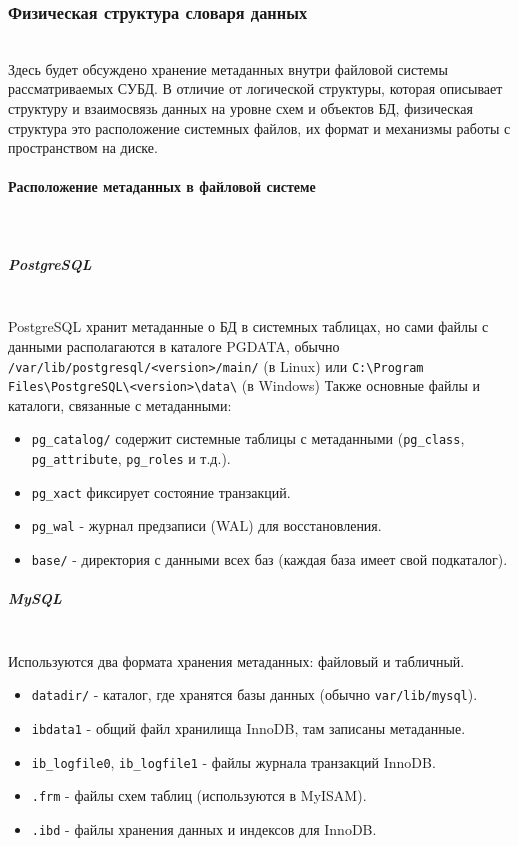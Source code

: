 \subsubsection{Физическая структура словаря данных} ~\\

Здесь будет обсуждено хранение метаданных внутри файловой системы рассматриваемых СУБД. В отличие от логической структуры, которая описывает структуру и взаимосвязь данных на уровне схем и объектов БД, физическая структура это расположение системных файлов, их формат и механизмы работы с пространством на диске.

\paragraph{Расположение метаданных в файловой системе} ~\\

\subparagraph{PostgreSQL} \autocite{PostgreSQLdocc65} ~\\

PostgreSQL хранит метаданные о БД в системных таблицах, но сами файлы с данными располагаются в каталоге PGDATA, обычно \texttt{/var/lib/postgresql/<version>/main/} (в Linux) или \texttt{C:\textbackslash{}Program Files\textbackslash{}PostgreSQL\textbackslash{}<version>\textbackslash{}data\textbackslash{}} (в Windows)
Также основные файлы и каталоги, связанные с метаданными:
\begin{itemize}
    \item \texttt{pg\_catalog/} содержит системные таблицы с метаданными (\texttt{pg\_class}, \texttt{pg\_attribute}, \texttt{pg\_roles} и т.д.).
    \item \texttt{pg\_xact} фиксирует состояние транзакций.
    \item \texttt{pg\_wal} - журнал предзаписи (WAL) для восстановления.
    \item \texttt{base/} - директория с данными всех баз (каждая база имеет свой подкаталог).
\end{itemize}

\subparagraph{MySQL} \autocite[§17.6]{Mysqldoc4} ~\\

Используются два формата хранения метаданных: файловый и табличный.

\begin{itemize}
    \item \texttt{datadir/} - каталог, где хранятся базы данных (обычно \texttt{var/lib/mysql}).
    \item \texttt{ibdata1} - общий файл хранилища InnoDB, там записаны метаданные.
    \item \texttt{ib\_logfile0}, \texttt{ib\_logfile1} - файлы журнала транзакций InnoDB.
    \item \texttt{.frm} - файлы схем таблиц (используются в MyISAM).
    \item \texttt{.ibd} - файлы хранения данных и индексов для InnoDB. 
\end{itemize}

